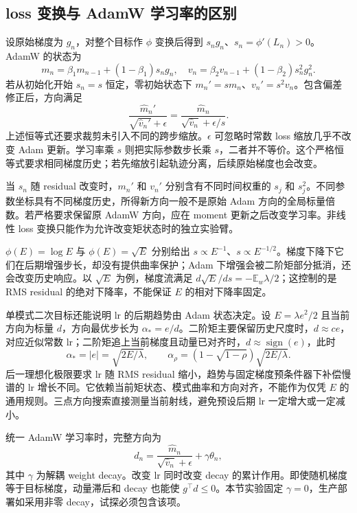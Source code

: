 \documentclass[lang=cn,scheme=chinese,openany]{../book/elegantbook}
\newcommand{\E}{\mathbb E}
\begin{document}
\subsection{loss 变换与 AdamW 学习率的区别}

设原始梯度为 $g_n$，对整个目标作 $\phi$ 变换后得到 $s_ng_n$、$s_n=\phi'(L_n)>0$。AdamW 的状态为
\begin{equation}
m_n=\beta_1m_{n-1}+(1-\beta_1)s_ng_n,\quad
v_n=\beta_2v_{n-1}+(1-\beta_2)s_n^2g_n^2.
\end{equation}
若从初始化开始 $s_n=s$ 恒定，零初始状态下 $m_n'=s m_n$、$v_n'=s^2v_n$。包含偏差修正后，方向满足
\begin{equation}
\frac{\widehat m_n'}{\sqrt{\widehat v_n'}+\epsilon}
=\frac{\widehat m_n}{\sqrt{\widehat v_n}+\epsilon/s}.
\end{equation}
上述恒等式还要求裁剪未引入不同的跨步缩放。$\epsilon$ 可忽略时常数 loss 缩放几乎不改变 Adam 更新。学习率乘 $s$ 则把实际参数步长乘 $s$，二者并不等价。这个严格恒等式要求相同梯度历史；若先缩放引起轨迹分离，后续原始梯度也会改变。

当 $s_n$ 随 residual 改变时，$m_n'$ 和 $v_n'$ 分别含有不同时间权重的 $s_j$ 和 $s_j^2$。不同参数坐标具有不同梯度历史，所得新方向一般不是原始 Adam 方向的全局标量倍数。若严格要求保留原 AdamW 方向，应在 moment 更新之后改变学习率。非线性 loss 变换只能作为允许改变矩状态时的独立实验臂。

$\phi(E)=\log E$ 与 $\phi(E)=\sqrt E$ 分别给出 $s\propto E^{-1}$、$s\propto E^{-1/2}$。梯度下降下它们在后期增强步长，却没有提供曲率保护；Adam 下增强会被二阶矩部分抵消，还会改变历史响应。以 $\sqrt E$ 为例，梯度流满足 $d\sqrt E/ds=-\E_w\lambda/2$；这控制的是 RMS residual 的绝对下降率，不能保证 $E$ 的相对下降率固定。

单模式二次目标还能说明 lr 的后期趋势由 Adam 状态决定。设 $E=\lambda e^2/2$ 且当前方向为标量 $d$，方向最优步长为 $\alpha_*=e/d$。二阶矩主要保留历史尺度时，$d\approx c e$，对应近似常数 lr；二阶矩追上当前梯度且动量已对齐时，$d\approx\operatorname{sign}(e)$，此时
\begin{equation}
\alpha_*=|e|=\sqrt{2E/\lambda},\qquad
\alpha_\rho=(1-\sqrt{1-\rho})\sqrt{2E/\lambda}.
\end{equation}
后一理想化极限要求 lr 随 RMS residual 缩小，趋势与固定梯度预条件器下补偿慢谱的 lr 增长不同。它依赖当前矩状态、模式曲率和方向对齐，不能作为仅凭 $E$ 的通用规则。三点方向搜索直接测量当前射线，避免预设后期 lr 一定增大或一定减小。

统一 AdamW 学习率时，完整方向为
\begin{equation}
d_n=\frac{\widehat m_n}{\sqrt{\widehat v_n}+\epsilon}+\gamma\theta_n,
\end{equation}
其中 $\gamma$ 为解耦 weight decay。改变 lr 同时改变 decay 的累计作用。即使随机梯度等于目标梯度，动量滞后和 decay 也能使 $g^\top d\le0$。本节实验固定 $\gamma=0$，生产部署如采用非零 decay，试探必须包含该项。
\end{document}
